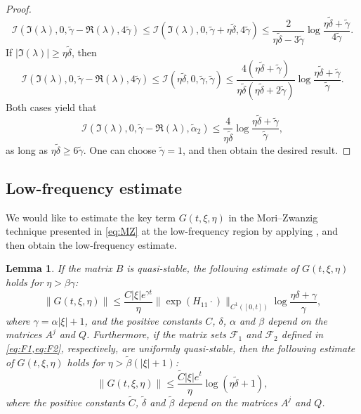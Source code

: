 \documentclass{article}
\theoremstyle{plain}%
\newtheorem{lemma}{Lemma}%
\theoremstyle{definition}%
\theoremstyle{remark}%
\newcommand{\cF}{\mathcal{F}}
\newcommand{\cI}{\mathcal{I}}
\newcommand{\+}[1]{{\bm{#1}}}
\begin{document}
\begin{proof}
\begin{displaymath}
    \cI(\Im(\lambda), 0, \tilde{\gamma} - \Re(\lambda), 
    4 \tilde{\gamma}) \le 
    \cI(\Im(\lambda), 0, \tilde{\gamma} + \eta \tilde{\delta}, 
    4 \tilde{\gamma}) \le 
    \frac{2}{\eta \tilde{\delta} - 3 \tilde{\gamma}} 
    \log 
    \frac{\eta \tilde{\delta} + \tilde{\gamma}}{4 \tilde{\gamma}}.
  \end{displaymath}
  If $|\Im(\lambda)| \ge \eta \tilde{\delta}$, then 
  \begin{displaymath}
    \cI(\Im(\lambda), 0, \tilde{\gamma} - \Re(\lambda), 
    4 \tilde{\gamma}) \le 
    \cI(\eta \tilde{\delta}, 0, \tilde{\gamma}, \tilde{\gamma}) \le 
    \frac{4 (\eta \tilde{\delta} + \tilde{\gamma})}
    {\eta \tilde{\delta} (\eta \tilde{\delta} + 2 \tilde{\gamma})} 
    \log \frac{\eta \tilde{\delta} + \tilde{\gamma}}{\tilde{\gamma}}.
  \end{displaymath}
  Both cases yield that 
  \begin{displaymath}
    \cI(\Im(\lambda), 0, \tilde{\gamma} - \Re(\lambda), 
    \tilde{\alpha}_2) \le \frac{4}{\eta \tilde{\delta}} 
    \log \frac{\eta \tilde{\delta} + \tilde{\gamma}}{\tilde{\gamma}},
  \end{displaymath}
  as long as 
  $\eta \tilde{\delta} \ge 6 \tilde{\gamma}$.
  One can choose $\tilde{\gamma} = 1$, and then obtain the desired 
  result. 
\end{proof}


\subsection{Low-frequency estimate}
We would like to estimate the key term $G(t, \xi, \eta)$ in the 
Mori--Zwanzig technique presented in \cref{eq:MZ} at the 
low-frequency region by applying , and then obtain 
the low-frequency estimate.

\begin{lemma}\label{lemma:low_frequency_G}
  If the matrix $B$ is quasi-stable, the following estimate of 
  $G(t, \xi, \eta)$ holds for $\eta > \beta \gamma$:
  \begin{displaymath}
    \|G(t, \xi, \eta)\| \le \frac{C |\xi| e^{\gamma t}}{\eta} 
    \|\exp(H_{11} \cdot)\|_{C^1([0, t])} 
    \log \frac{\eta \delta + \gamma}{\gamma},
  \end{displaymath}
  where $\gamma = \alpha |\xi| + 1$, and the positive constants 
  $C$, $\delta$, $\alpha$ and $\beta$ depend on 
  the matrices $A^j$ and $Q$.
  Furthermore, if the matrix sets $\cF_1$ and $\cF_2$ defined in 
  \cref{eq:F1,eq:F2}, respectively, are uniformly quasi-stable, then 
  the following estimate of $G(t, \xi, \eta)$ holds for 
  $\eta > \tilde{\beta}(|\xi| + 1)$: 
  \begin{displaymath}
    \|G(t, \xi, \eta)\| \le \frac{\tilde{C} |\xi| e^t}{\eta} 
    \log(\eta \tilde{\delta} + 1),
  \end{displaymath}
  where the positive constants $\tilde{C}$, $\tilde{\delta}$ and 
  $\tilde{\beta}$ depend on the matrices $A^j$ and $Q$.
\end{lemma}
\end{document}
